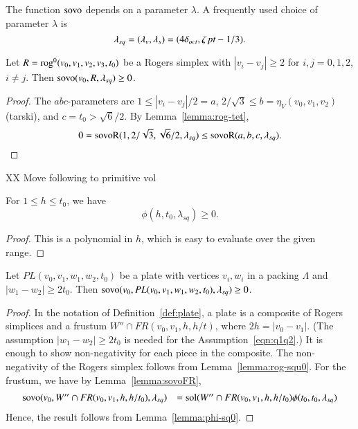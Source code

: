 The function ${\operatorname{sovo}}$ depends on a parameter $\lambda$.
A frequently used choice of parameter $\lambda$ is
$$
 \lambda_{sq} =(\lambda_v,\lambda_s)=(4\delta_{oct},\zeta\,\hbox{\it pt}-1/3).
$$


\begin{lemma}\label{lemma:rog-squ0}
Let $R={\operatorname{rog}}^0(v_0,v_1,v_2,v_3,t_0)$ be a Rogers simplex
with $|v_i-v_j|\ge 2$ for $i,j=0,1,2$, $i\ne j$.
Then ${\operatorname{sovo}}(v_0,R,\lambda_{sq})\ge 0$.
\end{lemma}

\begin{proof}
The $abc$-parameters are $1 \le |v_i-v_j|/2 = a$,
$2/\sqrt{3}\le b = \eta_V(v_0,v_1,v_2)$ (tarski),
and $c = t_0 > \sqrt6/2$.  By Lemma~\ref{lemma:rog-tet},
$$
0 = {\operatorname{sovoR}}(1,2/\sqrt{3},\sqrt{6}/2,\lambda_{sq}) 
   \le {\operatorname{sovoR}}(a,b,c,\lambda_{sq}).
$$
\end{proof}

XX Move following to primitive vol

\begin{lemma}\label{lemma:phi-sq0}
For $1\le h\le t_0$, we have
$$
\phi(h,t_0,\lambda_{sq})\ge 0.
$$
\end{lemma}

\begin{proof}
This is a polynomial in $h$, which is easy to evaluate over the
given range.
\end{proof}


\begin{lemma}\label{lemma:pl-sq0}
Let $PL(v_0,v_1,w_1,w_2,t_0)$ be a plate with
vertices $v_i,w_i$ in a packing $\Lambda$ and $|w_1-w_2|\ge 2 t_0$.
Then
${\operatorname{sovo}}(v_0,PL(v_0,v_1,w_1,w_2,t_0),\lambda_{sq}) \ge 0$. 
\end{lemma}

\begin{proof} In the notation of Definition~\ref{def:plate},
a plate is a composite of Rogers simplices and
a frustum $W''\cap FR(v_0,v_1,h,h/t)$,
where $2h = |v_0-v_1|$.  (The assumption $|w_1-w_2|\ge 2 t_0$
is needed for the Assumption~\ref{eqn:q1q2}.)
It is enough to show non-negativity for each piece in the composite.
The non-negativity of the Rogers simplex follows from Lemma~\ref{lemma:rog-squ0}.
For the frustum, we have by Lemma~\ref{lemma:sovoFR},
$$
\begin{array}{lll}
{\operatorname{sovo}}(v_0,W''\cap FR(v_0,v_1,h,h/t_0),\lambda_{sq}) &=
  \operatorname{sol}(W''\cap FR(v_0,v_1,h,h/t_0) \phi(t_0,t_0,\lambda_{sq})\\
\end{array}
$$
Hence, the result follows from Lemma~\ref{lemma:phi-sq0}.
\end{proof}

